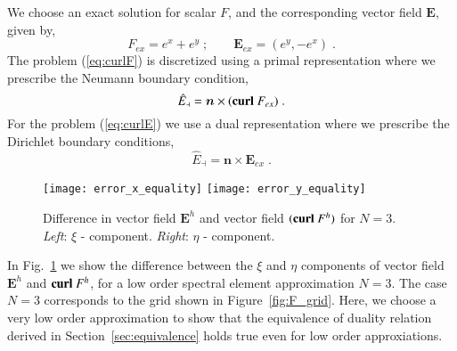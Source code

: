 \documentclass[graybox]{svmult}
\begin{document}
We choose an exact solution for scalar $F$, and the corresponding vector field $\bm{E}$, given by,
\begin{equation}
F_{ex} = e^x + e^y \;; \quad \quad \bm{E}_{ex} = (e^y, - e^x) \;.
\label{eq:F_and_E_exact}
\end{equation}
The problem (\ref{eq:curlF}) is discretized using a primal representation where we prescribe the Neumann boundary condition,
\begin{equation}
\hat{E}_{\dashv} = \bm{n} \times (\mbox{\bf{curl}}\ F_{ex})  \;.
\end{equation}
For the problem (\ref{eq:curlE}) we use a dual representation where we prescribe the Dirichlet boundary conditions,
\begin{equation}
\hat{E}_{\dashv} = \bm{n} \times \bm{E}_{ex}  \;.
\end{equation}

\begin{figure}
{\texttt{[image: error\_x\_equality]}} \quad \quad
{\texttt{[image: error\_y\_equality]}}
\caption{Difference in vector field $\bm{E}^h$ and vector field $(\mbox{\textbf{curl}}\ F^h)$ for $N=3$. \emph{Left}: $\xi$ - component. \emph{Right}: $\eta$ - component.}
\label{fig:equality_c_00}
\end{figure}

In Fig.~\ref{fig:equality_c_00} we show the difference between the $\xi$ and $\eta$ components of vector field $\bm{E}^h$ and $\mbox{\bf{curl}}\ F^h$, for a low order spectral element approximation $N = 3$. The case $N=3$ corresponds to the grid shown in Figure~\ref{fig:F_grid}.
Here, we choose a very low order approximation to show that the equivalence of duality relation derived in Section~\ref{sec:equivalence} holds true even for low order approxiations.
\end{document}
